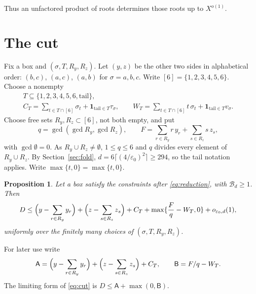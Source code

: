 \documentclass{amsart}
\newtheorem{proposition}[lemma]{Proposition}
\numberwithin{equation}{section}
\numberwithin{table}{section}
\newcommand{\pos}[1]{\max\{#1,0\}}
\begin{document}
Thus an unfactored product of roots determines those roots up to $X^{o(1)}$.

\section{The cut}\label{sec:cut}

Fix a box and $(\sigma,T,R_y,R_z)$. Let $(y,z)$ be the other two sides in
alphabetical order: $(b,c)$, $(a,c)$, $(a,b)$ for $\sigma=a,b,c$. Write $[6]=\{1,2,3,4,5,6\}$. Choose a nonempty
\begin{equation}\label{eq:T}
 \begin{gathered}
  T\subseteq\{1,2,3,4,5,6,\mathrm{tail}\},\\
  C_T=\sum_{t\in T\cap[6]}\sigma_t+\mathbf 1_{\mathrm{tail}\in T}\tau_\sigma,
  \qquad
  W_T=\sum_{t\in T\cap[6]}t\,\sigma_t+\mathbf 1_{\mathrm{tail}\in T}v_\sigma .
 \end{gathered}
\end{equation}
Choose free sets $R_y,R_z\subset[6]$, not both empty, and put
\begin{equation}\label{eq:q}
 q=\gcd(\gcd R_y,\gcd R_z),
 \qquad
 F=\sum_{r\in R_y}r\,y_r+\sum_{s\in R_z}s\,z_s,
\end{equation}
with $\gcd\emptyset=0$.
As $R_y\cup R_z\ne\emptyset$, $1\le q\le6$ and $q$ divides every element of
$R_y\cup R_z$. By Section~\ref{sec:fold}, $d=6\lceil(4/\varepsilon_0)^2\rceil\ge294$,
so the tail notation applies. Write $\pos{t}=\max\{t,0\}$.

\begin{proposition}\label{prop:cut}
Let a box satisfy the constraints after \eqref{eq:reduction}, with
$\mathcal B_d\ge1$. Then
\begin{equation}\label{eq:cut}
 D\le\Bigl(y-\sum_{r\in R_y}y_r\Bigr)+\Bigl(z-\sum_{s\in R_z}z_s\Bigr)
  +C_T+\pos{\frac Fq-W_T}+o_{\varepsilon_0,d}(1),
\end{equation}
uniformly over the finitely many choices of $(\sigma,T,R_y,R_z)$.
\end{proposition}

For later use write
\[
 \mathsf A=\Bigl(y-\sum_{r\in R_y}y_r\Bigr)+\Bigl(z-\sum_{s\in R_z}z_s\Bigr)+C_T,
 \qquad \mathsf B=F/q-W_T.
\]
The limiting form of \eqref{eq:cut} is
$D\le\mathsf A+\max(0,\mathsf B)$.
\end{document}
